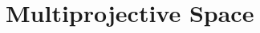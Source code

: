 \section{Multiprojective Space}

\begin{exercise}
    \td \\
\end{exercise}

\begin{solution}
    \td \\
\end{solution}

\begin{exercise}
    \td \\
\end{exercise}

\begin{solution}
    \td \\
\end{solution}

\begin{exercise}
    \td \\
\end{exercise}

\begin{solution}
    \td \\
\end{solution}

